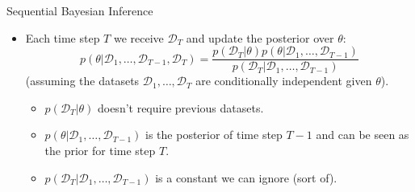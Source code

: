 \documentclass[12pt,aspectratio=169, handout]{beamer}
\let\olditem\item
\renewcommand\item{\olditem\justifying}
\begin{document}
\begin{frame}{Sequential Bayesian Inference}
\begin{itemize}
    \item Each time step $T$ we receive $\mathcal{D}_T$ and update the posterior over $\theta$:
        $$p(\theta|\mathcal{D}_1,\ldots,\mathcal{D}_{T-1},\mathcal{D}_T) = \frac{p(\mathcal{D}_T | \theta)p(\theta|\mathcal{D}_1,\ldots,\mathcal{D}_{T-1})}{p(\mathcal{D}_T|\mathcal{D}_1,\ldots,\mathcal{D}_{T-1})}$$
    (assuming the datasets $\mathcal{D}_1,\ldots,\mathcal{D}_T$ are conditionally independent given $\theta$).
    \pause
    \begin{itemize}[<+->]
        \item $p(\mathcal{D}_T | \theta)$ doesn't require previous datasets.
        \item $p(\theta|\mathcal{D}_1,\ldots,\mathcal{D}_{T-1})$ is the posterior of time step $T-1$ and can be seen as the prior for time step $T$.
        \item $p(\mathcal{D}_T|\mathcal{D}_1,\ldots,\mathcal{D}_{T-1})$ is a constant we can ignore (sort of).
    \end{itemize}
\end{itemize}
    
\end{frame}


    
\end{document}
